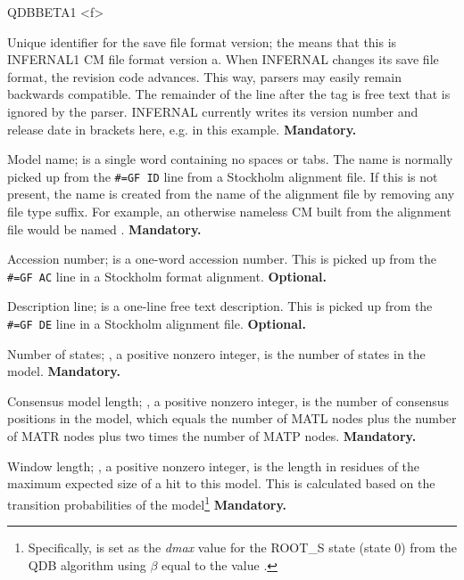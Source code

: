 \begin{sreitems}{QDBBETA1 <f>}

\item [\emprog{INFERNAL1/a}] Unique identifier for the save file format
  version; the  means that this is INFERNAL1 CM file format
  version a. When INFERNAL changes its save file format, the revision
  code advances. This way, parsers may easily remain backwards
  compatible. The remainder of the line after the  tag
  is free text that is ignored by the parser. INFERNAL currently writes
  its version number and release date in brackets here,
  e.g. \prog{[1.1 | June 2012]} in this
  example. \textbf{Mandatory.}

\item [\emprog{NAME <s>}] Model name;  is a single word
containing no spaces or tabs. The name is normally picked up from the
\verb+#=GF ID+ line from a Stockholm alignment file.  If this is not
present, the name is created from the name of the alignment file by
removing any file type suffix. For example, an otherwise nameless CM
built from the alignment file  would be named
.  \textbf{Mandatory.}

\item [\emprog{ACC <s>}] Accession number;  is a one-word
accession number. This is picked up from the \verb+#=GF AC+ line in a
Stockholm format alignment. \textbf{Optional.}

\item [\emprog{DESC <s>}] Description line;  is a one-line
free text description. This is picked up from the \verb+#=GF DE+ line
in a Stockholm alignment file. \textbf{Optional.}

\item [\emprog{STATES <d>}] Number of states; , a positive nonzero
integer, is the number of states in the model.
\textbf{Mandatory.}

\item [\emprog{CLEN <d>}] Consensus model length; , a positive nonzero
integer, is the number of consensus positions in the model, which
equals the number of MATL nodes plus the number of MATR nodes plus two
times the number of MATP nodes.
\textbf{Mandatory.}

\item [\emprog{W <d>}] Window length; , a positive nonzero
integer, is the length in residues of the maximum expected size of a
hit to this model. This is calculated based on the transition
probabilities of the model\footnote{Specifically,  is set as
the \emph{dmax} value for the ROOT\_S state (state 0) from the QDB
algorithm using $\beta$ equal to the  value
\citep{NawrockiEddy07}.}  \textbf{Mandatory.}


\end{sreitems}

